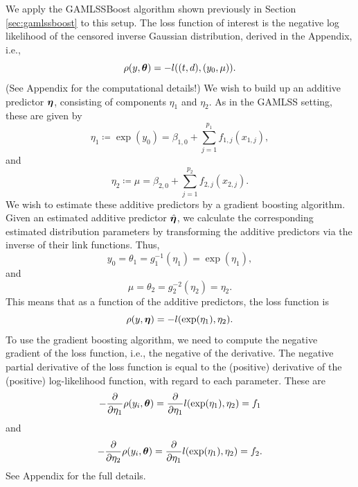 We apply the GAMLSSBoost algorithm shown previously in Section \ref{sec:gamlssboost} to this setup.
The loss function of interest is the negative log likelihood of the censored inverse Gaussian distribution, derived in the Appendix, i.e.,
\begin{equation*}
    \rho(y,\boldsymbol{\theta})=-l((t,d), (y_0,\mu)).
\end{equation*}
(See Appendix for the computational details!)
We wish to build up an additive predictor $\boldsymbol{\eta}$, consisting of components $\eta_1$ and $\eta_2$.
As in the GAMLSS setting, these are given by
\begin{equation}
    \eta_1\coloneqq \exp(y_0)=\beta_{1,0}+\sum_{j=1}^{p_1}f_{1,j}(x_{1,j}),
\end{equation}
and
\begin{equation}
    \eta_2\coloneqq \mu=\beta_{2,0}+\sum_{j=1}^{p_2}f_{2,j}(x_{2,j}).
\end{equation}
We wish to estimate these additive predictors by a gradient boosting algorithm.
Given an estimated additive predictor $\hat{\boldsymbol{\eta}}$, we calculate the corresponding estimated distribution parameters by transforming the additive predictors via the inverse of their link functions.
Thus,
\begin{equation}
    y_0=\theta_1=g_1^{-1}(\eta_1)=\exp(\eta_1),
\end{equation}
and
\begin{equation}
    \mu=\theta_2=g_2^{-2}(\eta_2)=\eta_2.
\end{equation}
This means that as a function of the additive predictors, the loss function is
\begin{equation*}
    \rho(y,\boldsymbol{\eta})=-l(\exp(\eta_1), \eta_2).
\end{equation*}
To use the gradient boosting algorithm, we need to compute the negative gradient of the loss function, i.e., the negative of the derivative. 
The negative partial derivative of the loss function is equal to the (positive) derivative of the (positive) log-likelihood function, with regard to each parameter.
These are
\begin{equation}
    -\frac{\partial}{\partial\eta_1}\rho(y_i,\boldsymbol{\theta})=\frac{\partial}{\partial\eta_1}l(\exp(\eta_1), \eta_2)=f_1
\end{equation}
and
\begin{equation}
    -\frac{\partial}{\partial\eta_2}\rho(y_i,\boldsymbol{\theta})=\frac{\partial}{\partial\eta_1}l(\exp(\eta_1), \eta_2)=f_2.
\end{equation}
See Appendix for the full details.

